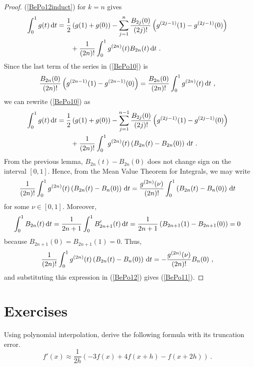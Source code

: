 \begin{proof}
(\ref{BePo12induct}) for $k=n$ gives
\begin{equation}\label{BePo10}
\begin{split}
\int_0^1 g(t)\,\mathrm{d}t &= \frac{1}{2} \left(g(1)+g(0)\right)
- \sum_{j=1}^n \frac{B_{2j}(0)}{(2j)!}
\left(g^{(2j-1)}(1)-g^{(2j-1)}(0)\right) \\
& \qquad + \frac{1}{(2n)!} \int_0^1 g^{(2n)}(t) B_{2n}(t) \,\mathrm{d}t \ .
\end{split}
\end{equation}
Since the last term of the series in (\ref{BePo10}) is
\[
\frac{B_{2n}(0)}{(2n)!}
\left(g^{(2n-1)}(1)-g^{(2n-1)}(0)\right)
= \frac{B_{2n}(0)}{(2n)!} \int_0^1 g^{(2n)}(t)\,\mathrm{d}t \ ,
\]
we can rewrite (\ref{BePo10}) as
\begin{equation}\label{BePo12}
\begin{split}
\int_0^1 g(t)\,\mathrm{d}t& = \frac{1}{2} \left(g(1)+g(0)\right)
- \sum_{j=1}^{n-1} \frac{B_{2j}(0)}{(2j)!}
\left(g^{(2j-1)}(1)-g^{(2j-1)}(0)\right)\\
& \qquad + \frac{1}{(2n)!} \int_0^1 g^{(2n)}(t)
\left( B_{2n}(t) - B_{2n}(0)\right) \,\mathrm{d}t \ .
\end{split}
\end{equation}
From the previous lemma, $B_{2n}(t) - B_{2n}(0)$ does not change sign on
the interval $[0,1]$.  Hence, from the Mean Value Theorem for
Integrals, we may write
\[
\frac{1}{(2n)!} \int_0^1 g^{(2n)}(t)
\left( B_{2n}(t) - B_n(0)\right) \,\mathrm{d}t =
\frac{g^{(2n)}(\nu)}{(2n)!} \int_0^1 
\left( B_{2n}(t) - B_n(0)\right) \,\mathrm{d}t
\]
for some $\nu \in [0,1]$.  Moreover,
\[
\int_0^1 B_{2n}(t) \,\mathrm{d}t
= \frac{1}{2n+1}\int_0^1 B_{2n+1}'(t) \,\mathrm{d}t
= \frac{1}{2n+1}\left( B_{2n+1}(1)-B_{2n+1}(0) \right) = 0
\]
because $B_{2n+1}(0) = B_{2n+1}(1) = 0$.  Thus,
\[
\frac{1}{(2n)!} \int_0^1 g^{(2n)}(t)
\left( B_{2n}(t) - B_n(0)\right) \,\mathrm{d}t =
- \frac{g^{(2n)}(\nu)}{(2n)!} B_n(0) \ ,
\]
and substituting this expression in (\ref{BePo12}) gives
(\ref{BePo11}).
\end{proof}

\section{Exercises}

\begin{question}
Using polynomial interpolation, derive the following formula with its
truncation error.
\begin{equation}\label{dfapproxA}
f'(x) \approx \frac{1}{2h}\left(-3f(x)+4f(x+h)-f(x+2h)\right) \ .
\end{equation}
\end{question}

